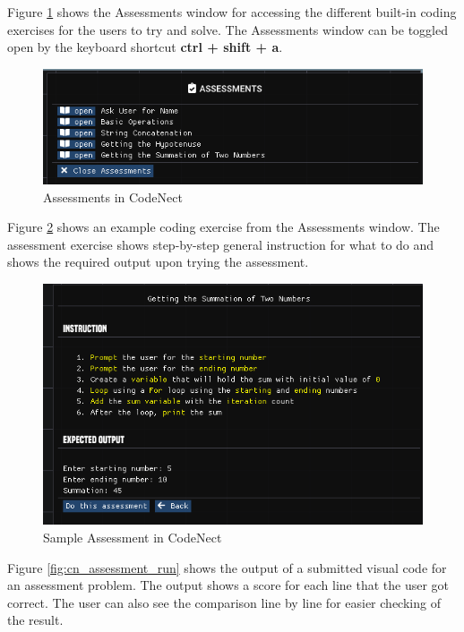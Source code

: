 \parx
Figure \ref{fig:cn_assessment} shows the Assessments window for accessing the
different built-in coding exercises for the users to try and solve. The
Assessments window can be toggled open by the keyboard shortcut \textbf{ctrl
+ shift + a}.

\begin{figure}[H]
	\centering
	\captionsetup{justification=centering}
	\captionsetup[figure]{list=yes}
	\includegraphics[width=\linewidth]{media/sc_assessments.png}
	\caption[Assessments in CodeNect]{Assessments in CodeNect}
	\label{fig:cn_assessment}
\end{figure}

\parx
Figure \ref{fig:cn_assessment_sample} shows an example coding exercise from the Assessments
window. The assessment exercise shows step-by-step general instruction for what to do
and shows the required output upon trying the assessment.

\begin{figure}[H]
	\centering
	\captionsetup{justification=centering}
	\captionsetup[figure]{list=yes}
	\includegraphics[width=\linewidth]{media/sc_assessments_sample.png}
	\caption[Sample Assessment in CodeNect]{Sample Assessment in CodeNect}
	\label{fig:cn_assessment_sample}
\end{figure}

\parx
Figure \ref{fig:cn_assessment_run} shows the output of a submitted visual code for
an assessment problem. The output shows a score for each line that the user got
correct. The user can also see the comparison line by line for easier checking of
the result.

